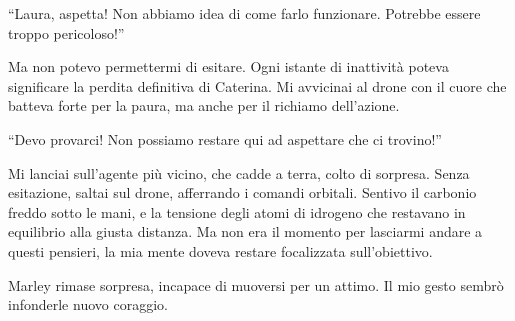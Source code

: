 \begin{dialogue}
 \enquote{Laura, aspetta! Non abbiamo idea di come farlo funzionare. Potrebbe essere troppo pericoloso!}
\end{dialogue}

Ma non potevo permettermi di esitare. Ogni istante di inattività poteva significare la perdita definitiva di Caterina. Mi avvicinai al drone con il cuore che batteva forte per la paura, ma anche per il richiamo dell'azione.

\begin{dialogue}
 \enquote{Devo provarci! Non possiamo restare qui ad aspettare che ci trovino!}
\end{dialogue}

Mi lanciai sull'agente più vicino, che cadde a terra, colto di sorpresa. Senza esitazione, saltai sul drone, afferrando i comandi orbitali. Sentivo il carbonio freddo sotto le mani, e la tensione degli atomi di idrogeno che restavano in equilibrio alla giusta distanza. Ma  non era il momento per lasciarmi andare a questi pensieri, la mia mente doveva restare focalizzata sull'obiettivo.

Marley rimase sorpresa, incapace di muoversi per un attimo. Il mio gesto sembrò infonderle nuovo coraggio.

\begin{center}
\begin{minipage}{0.7\textwidth}
    \centering
\end{minipage}
\end{center}

